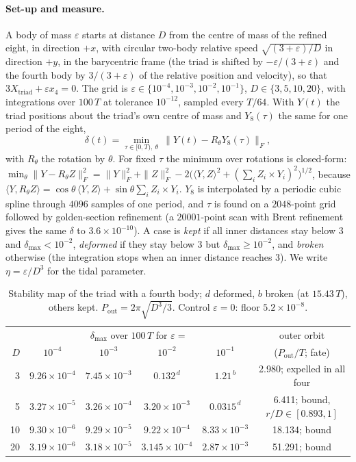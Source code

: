 \documentclass[11pt]{article}
\theoremstyle{definition}\newtheorem{definition}[theorem]{Definition}
\theoremstyle{remark}\newtheorem{remark}[theorem]{Remark}
\begin{document}
\paragraph{Set-up and measure.} A body of mass $\varepsilon$ starts at distance $D$ from the centre of mass of the refined eight, in direction $+x$, with circular two-body relative speed $\sqrt{(3+\varepsilon)/D}$ in direction $+y$, in the barycentric frame (the triad is shifted by $-\varepsilon/(3+\varepsilon)$ and the fourth body by $3/(3+\varepsilon)$ of the relative position and velocity), so that $3X_{\mathrm{triad}}+\varepsilon x_4=0$. The grid is $\varepsilon\in\{10^{-4},10^{-3},10^{-2},10^{-1}\}$, $D\in\{3,5,10,20\}$, with integrations over $100\,T$ at tolerance $10^{-12}$, sampled every $T/64$. With $Y(t)$ the triad positions about the triad's own centre of mass and $Y_8(\tau)$ the same for one period of the eight,
\[
\delta(t)=\min_{\tau\in[0,T),\ \theta}\ \bigl\|Y(t)-R_\theta Y_8(\tau)\bigr\|_F ,
\]
with $R_\theta$ the rotation by $\theta$. For fixed $\tau$ the minimum over rotations is closed-form: $\min_\theta\|Y-R_\theta Z\|_F^2=\|Y\|_F^2+\|Z\|_F^2-2\bigl(\langle Y,Z\rangle^2+(\sum_iZ_i\times Y_i)^2\bigr)^{1/2}$, because $\langle Y,R_\theta Z\rangle=\cos\theta\,\langle Y,Z\rangle+\sin\theta\sum_iZ_i\times Y_i$. $Y_8$ is interpolated by a periodic cubic spline through $4096$ samples of one period, and $\tau$ is found on a $2048$-point grid followed by golden-section refinement (a $20001$-point scan with Brent refinement gives the same $\delta$ to $3.6\times10^{-10}$). A case is \emph{kept} if all inner distances stay below $3$ and $\delta_{\max}<10^{-2}$, \emph{deformed} if they stay below $3$ but $\delta_{\max}\ge10^{-2}$, and \emph{broken} otherwise (the integration stops when an inner distance reaches $3$). We write $\eta=\varepsilon/D^3$ for the tidal parameter.

\begin{table}[t]\centering\small
\begin{tabular}{@{}r cccc c@{}}\toprule
 & \multicolumn{4}{c}{$\delta_{\max}$ over $100\,T$ for $\varepsilon=$} & outer orbit\\
$D$ & $10^{-4}$ & $10^{-3}$ & $10^{-2}$ & $10^{-1}$ & ($P_{\mathrm{out}}/T$; fate)\\\midrule
3 & $9.26\times10^{-4}$ & $7.45\times10^{-3}$ & $0.132^{\,d}$ & $1.21^{\,b}$ & 2.980; expelled in all four\\
5 & $3.27\times10^{-5}$ & $3.26\times10^{-4}$ & $3.20\times10^{-3}$ & $0.0315^{\,d}$ & 6.411; bound, $r/D\in[0.893,1]$\\
10 & $9.30\times10^{-6}$ & $9.29\times10^{-5}$ & $9.22\times10^{-4}$ & $8.33\times10^{-3}$ & 18.134; bound\\
20 & $3.19\times10^{-6}$ & $3.18\times10^{-5}$ & $3.145\times10^{-4}$ & $2.87\times10^{-3}$ & 51.291; bound\\\bottomrule
\end{tabular}
\caption{Stability map of the triad with a fourth body; $d$ deformed, $b$ broken (at $15.43\,T$), others kept. $P_{\mathrm{out}}=2\pi\sqrt{D^3/3}$. Control $\varepsilon=0$: floor $5.2\times10^{-8}$.}\label{tab:map}
\end{table}
\end{document}
